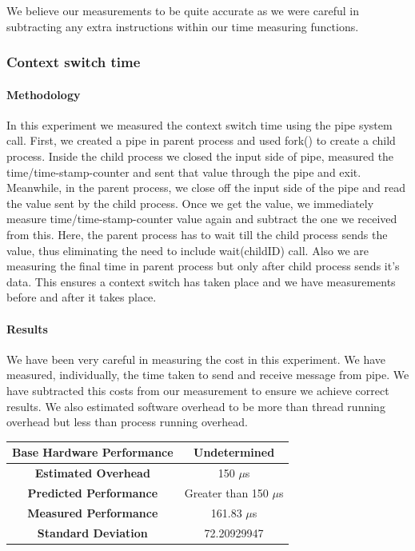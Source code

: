 \documentclass[conference]{IEEEtran}
\begin{document}
We believe our measurements to be quite accurate as we were careful in subtracting any extra instructions within our time measuring functions.



\subsubsection{Context switch time}

\paragraph{Methodology}

In this experiment we measured the context switch time using the pipe system call.
First, we created a pipe in parent process and used fork() to create a child process. Inside the child process we closed the input side of pipe, measured the time/time-stamp-counter and sent that value through the pipe and exit. Meanwhile, in the parent process, we close off the input side of the pipe and read the value sent by the child process. Once we get the value, we immediately measure time/time-stamp-counter value again and subtract the one we received from this. 
Here, the parent process has to wait till the child process sends the value, thus eliminating the need to include wait(childID) call. Also we are measuring the final time in parent process but only after child process sends it's data. This ensures a context switch has taken place and we have measurements before and after it takes place.

\paragraph{Results}

We have been very careful in measuring the cost in this experiment. We have measured, individually, the time taken to send and receive message from pipe. We have subtracted this costs from our measurement to ensure we achieve correct results.
We also estimated software overhead to be more than thread running overhead but less than process running overhead.

\begin{center}
\begin{tabular}{ |c|c| } 
  \hline
  \textbf{Base Hardware Performance} & Undetermined \\ 
  \hline
  \textbf{Estimated Overhead} &  150 $\mu$s \\ 
  \hline
  \textbf{Predicted Performance} & Greater than 150 $\mu$s \\ 
  \hline
  \textbf{Measured Performance} & 161.83 $\mu$s \\ 
  \hline
  \textbf{Standard Deviation} & 72.20929947  \\ 
  \hline
\end{tabular}
\end{center}
\end{document}

